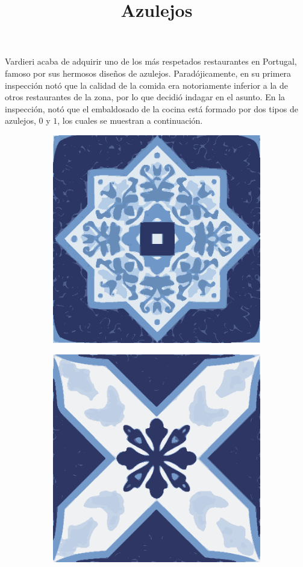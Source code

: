 \documentclass{oci}
\title{Azulejos}
\begin{document}
\begin{problemDescription}
Vardieri acaba de adquirir uno de los más respetados restaurantes en Portugal,
famoso por sus hermosos diseños de azulejos.
Paradójicamente, en su primera inspección notó que la calidad de la comida era
notoriamente inferior a la de otros restaurantes de la zona, por lo que decidió
indagar en el asunto.
En la inspección, notó que el embaldosado de la cocina está formado por dos
tipos de azulejos, $0$ y $1$, los cuales se muestran a continuación.

\begin{figure}[h]
  \centering
  \begin{subfigure}{0.4\textwidth}
    \centering
    \includegraphics[scale=0.3]{a.eps}
  \end{subfigure}
  \begin{subfigure}{0.4\textwidth}
    \centering
    \includegraphics[scale=0.3]{b.eps}
  \end{subfigure}
\end{figure}


\end{problemDescription}
\end{document}
